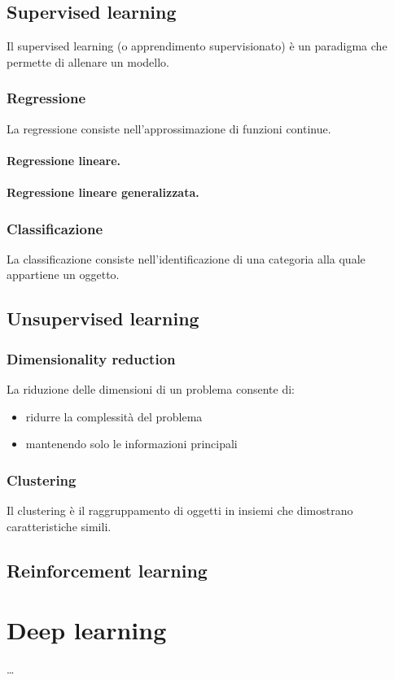 \subsection{Supervised learning}
Il supervised learning (o apprendimento supervisionato) è un paradigma che permette di allenare un modello.

\subsubsection{Regressione}
La regressione consiste nell'approssimazione di funzioni continue.
\paragraph{Regressione lineare.}
\paragraph{Regressione lineare generalizzata.}

\subsubsection{Classificazione}
La classificazione consiste nell'identificazione di una categoria alla quale appartiene un oggetto.


\subsection{Unsupervised learning}

\subsubsection{Dimensionality reduction}
La riduzione delle dimensioni di un problema consente di:
\begin{itemize}
    \item ridurre la complessità del problema
    \item mantenendo solo le informazioni principali
\end{itemize}

\begin{example}
\end{example}

\subsubsection{Clustering}
Il clustering è il raggruppamento di oggetti in insiemi che dimostrano caratteristiche simili.


\subsection{Reinforcement learning}

\section{Deep learning}
\dots




